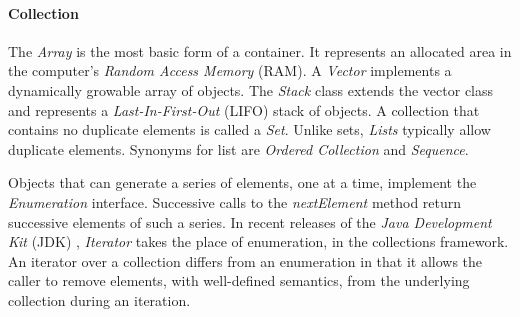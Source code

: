 %
%
%
%
%
%
%

\paragraph{Collection}
\label{collection_heading}

The \emph{Array} is the most basic form of a container. It represents an allocated
area in the computer's \emph{Random Access Memory} (RAM). A \emph{Vector}
implements a dynamically growable array of objects. The \emph{Stack} class extends
the vector class and represents a \emph{Last-In-First-Out} (LIFO) stack of objects.
A collection that contains no duplicate elements is called a \emph{Set}. Unlike
sets, \emph{Lists} typically allow duplicate elements. Synonyms for list are
\emph{Ordered Collection} and \emph{Sequence}.

Objects that can generate a series of elements, one at a time, implement the
\emph{Enumeration} interface. Successive calls to the \emph{nextElement} method
return successive elements of such a series. In recent releases of the
\emph{Java Development Kit} (JDK) \cite{java}, \emph{Iterator} takes the place
of enumeration, in the collections framework. An iterator over a collection
differs from an enumeration in that it allows the caller to remove elements,
with well-defined semantics, from the underlying collection during an iteration.
